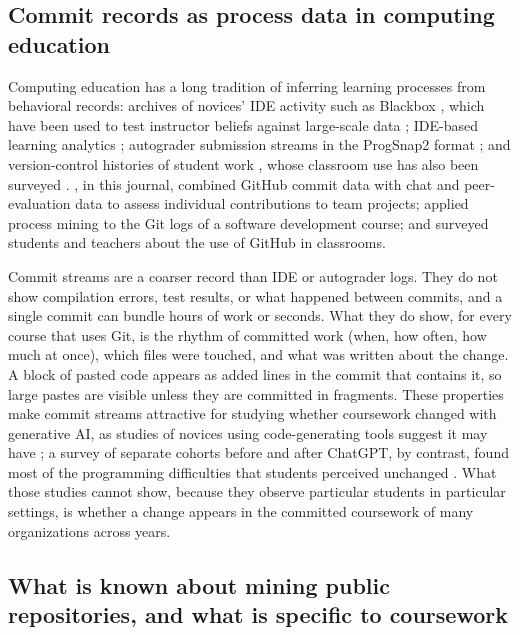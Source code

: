 \documentclass[acmsmall,screen,review,anonymous]{acmart}
\begin{document}
\subsection{Commit records as process data in computing education}

Computing education has a long tradition of inferring learning processes from behavioral records: archives of novices' IDE activity such as Blackbox \citep{brown2014blackbox, brown2022novice}, which have been used to test instructor beliefs against large-scale data \citep{brown2017mistakes}; IDE-based learning analytics \citep{hundhausen2017ide}; autograder submission streams in the ProgSnap2 format \citep{price2020progsnap2}; and version-control histories of student work \citep{hundhausen2023github, macak2021process}, whose classroom use has also been surveyed \citep{hsing2019github}. \citet{hundhausen2023github}, in this journal, combined GitHub commit data with chat and peer-evaluation data to assess individual contributions to team projects; \citet{macak2021process} applied process mining to the Git logs of a software development course; and \citet{hsing2019github} surveyed students and teachers about the use of GitHub in classrooms.

Commit streams are a coarser record than IDE or autograder logs. They do not show compilation errors, test results, or what happened between commits, and a single commit can bundle hours of work or seconds. What they do show, for every course that uses Git, is the rhythm of committed work (when, how often, how much at once), which files were touched, and what was written about the change. A block of pasted code appears as added lines in the commit that contains it, so large pastes are visible unless they are committed in fragments. These properties make commit streams attractive for studying whether coursework changed with generative AI, as studies of novices using code-generating tools suggest it may have \citep{kazemitabaar2023novices, prather2023weird, prather2024widening}; a survey of separate cohorts before and after ChatGPT, by contrast, found most of the programming difficulties that students perceived unchanged \citep{bikangaada2026separate}. What those studies cannot show, because they observe particular students in particular settings, is whether a change appears in the committed coursework of many organizations across years.

\subsection{What is known about mining public repositories, and what is specific to coursework}
\end{document}
